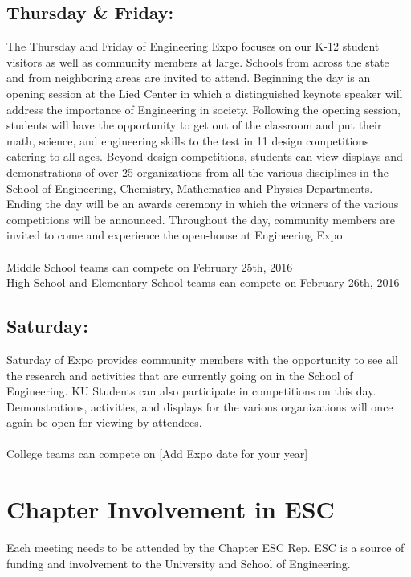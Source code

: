 \subsection*{Thursday \& Friday:}

The Thursday and Friday of Engineering Expo focuses on our K-12 student
visitors as well as community members at large. Schools from across the state
and from neighboring areas are invited to attend. Beginning the day is an
opening session at the Lied Center in which a distinguished keynote speaker
will address the importance of Engineering in society. Following the opening
session, students will have the opportunity to get out of the classroom and put
their math, science, and engineering skills to the test in 11 design
competitions catering to all ages. Beyond design competitions, students can view
displays and demonstrations of over 25 organizations from all the various
disciplines in the School of Engineering, Chemistry, Mathematics and Physics
Departments. Ending the day will be an awards ceremony in which the winners of
the various competitions will be announced. Throughout the day, community
members are invited to come and experience the open-house at Engineering Expo.
\\
\\
Middle School teams can compete on February 25th, 2016
\\
High School and Elementary School teams can compete on February 26th, 2016

\subsection*{Saturday:}

Saturday of Expo provides community members with the opportunity to see all the
research and activities that are currently going on in the School of Engineering.
KU Students can also participate in competitions on this day. Demonstrations,
activities, and displays for the various organizations will once again be open
for viewing by attendees.
\\
\\
College teams can compete on [Add Expo date for your year]

\section{Chapter Involvement in ESC}

Each meeting needs to be attended by the Chapter ESC Rep. ESC is a source of
funding and involvement to the University and School of Engineering.

